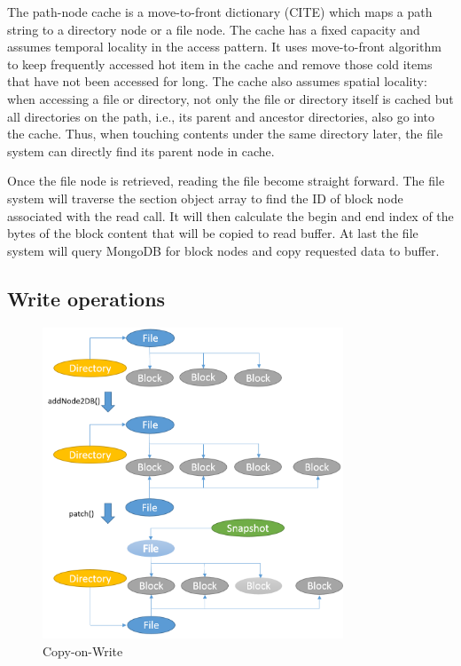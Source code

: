     The path-node cache is a move-to-front dictionary (CITE) which maps a path string to a directory node or a file node. The cache has a fixed capacity and assumes temporal locality in the access pattern. It uses move-to-front algorithm to keep frequently accessed hot item in the cache and remove those cold items that have not been accessed for long. The cache also assumes spatial locality: when accessing a file or directory, not only the file or directory itself is cached but all directories on the path, i.e., its parent and ancestor directories, also go into the cache. Thus, when touching contents under the same directory later, the file system can directly find its parent node in cache.

    Once the file node is retrieved, reading the file become straight forward. The file system will traverse the section object array to find the ID of block node associated with the read call. It will then calculate the begin and end index of the bytes of the block content that will be copied to read buffer. At last the file system will query MongoDB for block nodes and copy requested data to buffer.

\subsection{Write operations}

\begin{figure}[hbtp]
\centering
\includegraphics[width=0.8\textwidth]{Chapter-3/figs/fig10.png}
\caption{Copy-on-Write}
\label{fig:cow}
\end{figure}

